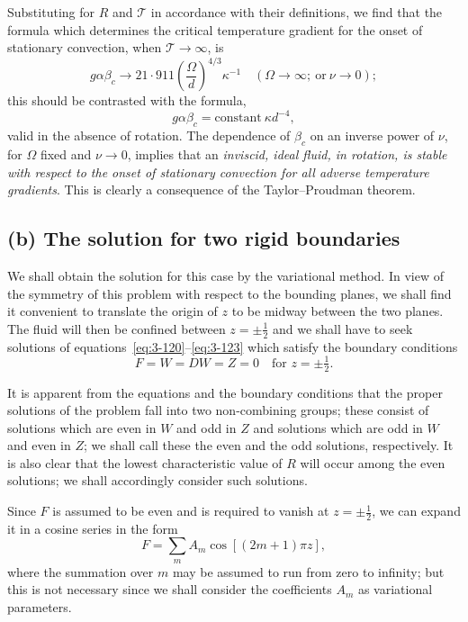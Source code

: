 Substituting for $R$ and $\mathscr{T}$ in accordance with their definitions, we find that the formula which determines the critical temperature gradient for the onset of stationary convection, when $\mathscr{T}\to\infty$, is
\begin{equation}\label{eq:3-134}
g\alpha\beta_c \to 21{\cdot}911\!\left(\frac{\Omega}{d}\right)^{\!4/3}\!\kappa^{-1} \quad (\Omega\to\infty;\ \text{or}\ \nu\to 0);
\end{equation}
this should be contrasted with the formula,
\begin{equation}\label{eq:3-135}
g\alpha\beta_c = \text{constant}\ \kappa d^{-4},
\end{equation}
valid in the absence of rotation. The dependence of $\beta_c$ on an inverse power of $\nu$, for $\Omega$ fixed and $\nu\to 0$, implies that an \emph{inviscid, ideal fluid, in rotation, is stable with respect to the onset of stationary convection for all adverse temperature gradients}. This is clearly a consequence of the Taylor--Proudman theorem.

\subsection*{(b) The solution for two rigid boundaries}

We shall obtain the solution for this case by the variational method. In view of the symmetry of this problem with respect to the bounding planes, we shall find it convenient to translate the origin of $z$ to be midway between the two planes. The fluid will then be confined between $z = \pm\frac{1}{2}$ and we shall have to seek solutions of equations~\eqref{eq:3-120}--\eqref{eq:3-123} which satisfy the boundary conditions
\begin{equation}\label{eq:3-136}
F = W = DW = Z = 0 \quad \text{for } z = \pm\tfrac{1}{2}.
\end{equation}

It is apparent from the equations and the boundary conditions that the proper solutions of the problem fall into two non-combining groups; these consist of solutions which are even in $W$ and odd in $Z$ and solutions which are odd in $W$ and even in $Z$; we shall call these the even and the odd solutions, respectively. It is also clear that the lowest characteristic value of $R$ will occur among the even solutions; we shall accordingly consider such solutions.

Since $F$ is assumed to be even and is required to vanish at $z = \pm\frac{1}{2}$, we can expand it in a cosine series in the form
\begin{equation}\label{eq:3-137}
F = \sum_m A_m\cos[(2m+1)\pi z],
\end{equation}
where the summation over $m$ may be assumed to run from zero to infinity; but this is not necessary since we shall consider the coefficients $A_m$ as variational parameters.

